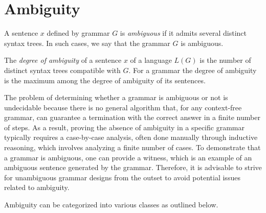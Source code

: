 \section{Ambiguity}

\begin{definition}
    A sentence $x$ defined by grammar $G$ is \emph{ambiguous} if it admits several distinct syntax trees. 
    In such cases, we say that the grammar $G$ is ambiguous.

    The \emph{degree of ambiguity} of a sentence $x$ of a language $L(G)$ is the number of distinct syntax trees compatible with $G$. 
    For a grammar the degree of ambiguity is the maximum among the degree of ambiguity of its sentences.
\end{definition}
The problem of determining whether a grammar is ambiguous or not is undecidable because there is no general algorithm that, for any context-free grammar, can guarantee a termination with the correct answer in a finite number of steps.
As a result, proving the absence of ambiguity in a specific grammar typically requires a case-by-case analysis, often done manually through inductive reasoning, which involves analyzing a finite number of cases.
To demonstrate that a grammar is ambiguous, one can provide a witness, which is an example of an ambiguous sentence generated by the grammar. 
Therefore, it is advisable to strive for unambiguous grammar designs from the outset to avoid potential issues related to ambiguity. 

Ambiguity can be categorized into various classes as outlined below.

